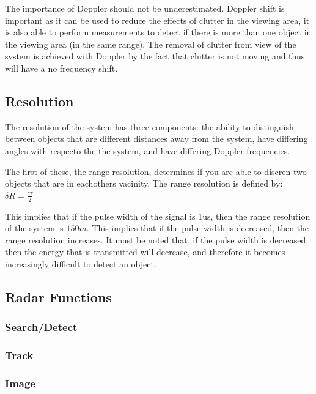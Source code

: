 \documentclass[11pt]{witseiepaper}
\begin{document}
The importance of Doppler should not be underestimated. Doppler shift is important as it can be used to reduce the effects of clutter in the viewing area, it is also able to perform measurements to detect if there is more than one object in the viewing area (in the same range). The removal of clutter from view of the system is achieved with Doppler by the fact that clutter is not moving and thus will have a no frequency shift.

\subsection{Resolution} \label{sec:Resolution}

The resolution of the system has three components: the ability to distinguish between objects that are different distances away from the system, have differing angles with respecto the the system, and have differing Doppler frequencies.

The first of these, the range resolution, determines if you are able to discren two objects that are in eachothers vacinity.
The range resolution is defined by:
$\delta R = \frac{c \tau}{2}$

This implies that if the pulse width of the signal is 1us, then the range resolution of the system is $150 m$. This implies that if the pulse width is decreased, then the range resolution increases.
It must be noted that, if the pulse width is decreased, then the energy that is transmitted will decrease, and therefore it becomes increasingly difficult to detect an object.


\subsection{Radar Functions} \label{sec:RadarFunctions}

\subsubsection{Search/Detect} \label{sec:SearchDetect}

\subsubsection{Track} \label{sec:Track}

\subsubsection{Image} \label{sec:Image}
\end{document}
